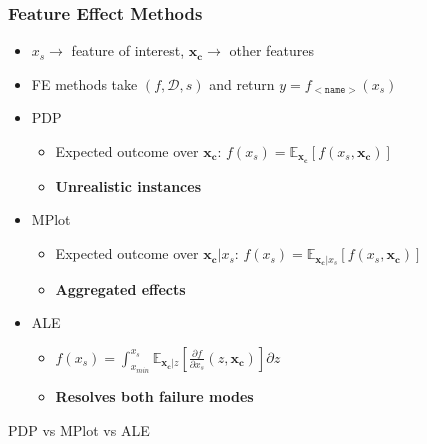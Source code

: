 \documentclass{beamer}
\begin{document}
\begin{frame}
  \frametitle{Feature Effect Methods}
  \begin{itemize}
  \item \(x_s \rightarrow \) feature of interest, \(\bm{x_c} \rightarrow\) other features
  \item FE methods take \((f, \mathcal{D}, s)\) and return \(y = f_{\mathtt{<name>}}(x_s)\)
  \end{itemize}

  \begin{itemize}
  \item<1-> PDP\citep{Friedman2001}
    \begin{itemize}
    \item Expected outcome over \(\bm{x_c}\): \(f(x_s) = \mathbb{E}_{\bm{x_c}}[f(x_s, \bm{x_c})]\)
    \item \textbf{Unrealistic instances}
    \end{itemize}

  \item<2-> MPlot\citep{Apley2020}
    \begin{itemize}
    \item Expected outcome over \(\bm{x_c}|x_s\): \(f(x_s) = \mathbb{E}_{\bm{x_c}|x_s}[f(x_s, \bm{x_c})]\)
    \item \textbf{Aggregated effects}
    \end{itemize}

  \item<3-> ALE\citep{Apley2020}
    \begin{itemize}
    \item \(f(x_s) = \int_{x_{min}}^{x_s}\mathbb{E}_{\bm{x_c}|z}[ \frac{\partial f}{\partial x_s}(z, \bm{x_c})] \partial z\)
    \item \textbf{Resolves both failure modes}
    \end{itemize}

  \end{itemize}
  \noindent\makebox[\linewidth]{\rule{\paperwidth}{0.4pt}}
  PDP vs MPlot vs ALE
\end{frame}
\end{document}
